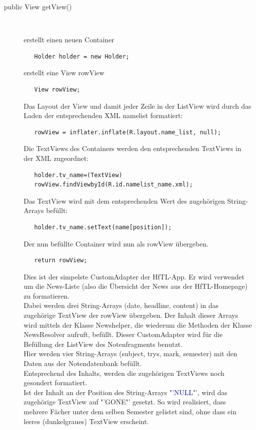 \begin{description}
\item [public View getView()]~\par
erstellt einen neuen Container 
\begin{lstlisting}
   Holder holder = new Holder;
\end{lstlisting}
erstellt eine View rowView
\begin{lstlisting}
   View rowView;
\end{lstlisting}
Das Layout der View und damit jeder Zeile in der ListView wird durch das Laden der entsprechenden XML namelist formatiert:
\begin{lstlisting}
   rowView = inflater.inflate(R.layout.name_list, null);
\end{lstlisting}
Die TextViews des Containers werden den entsprechenden TextViews in der XML zugeordnet:
\begin{lstlisting}
   holder.tv_name=(TextView)
   rowView.findViewbyId(R.id.namelist_name.xml);
\end{lstlisting}
Das TextView wird mit dem entsprechenden Wert des zugehörigen String-Arrays befüllt:
\begin{lstlisting}
   holder.tv_name.setText(name[position]);
\end{lstlisting}
Der nun befüllte Container wird nun als rowView übergeben.
\begin{lstlisting}
   return rowView;
\end{lstlisting}
Dies ist der simpelste CustomAdapter der HfTL-App. Er wird verwendet um die News-Liste (also die Übersicht der News aus der HfTL-Homepage) zu formatieren.\\
Dabei werden drei String-Arrays (date, headline, content) in das zugehörige TextView der rowView übergeben. Der Inhalt dieser Arrays wird mittels der Klasse Newshelper, die wiederum die Methoden der Klasse NewsResolver aufruft, befüllt.
Dieser CustomAdapter wird für die Befüllung der ListView des Notenfragments benutzt.\\
Hier werden vier String-Arrays (\textcolor{lila}{subject}, \textcolor{lila}{trys}, \textcolor{lila}{mark}, \textcolor{lila}{semester}) mit den Daten aus der Notendatenbank befüllt.\\
Entsprechend des Inhalts, werden die zugehörigen TextViews noch gesondert formatiert.\\
Ist der Inhalt an der Position des String-Arrays "'\textcolor{darkblue}{NULL}"', wird das zugehörige TextView auf "'\textcolor{lila}{GONE}"' gesetzt. So wird realisiert, dass mehrere Fächer unter dem selben Semester gelistet sind, ohne dass ein leeres (dunkelgraues) TextView erscheint.

\end{description}
